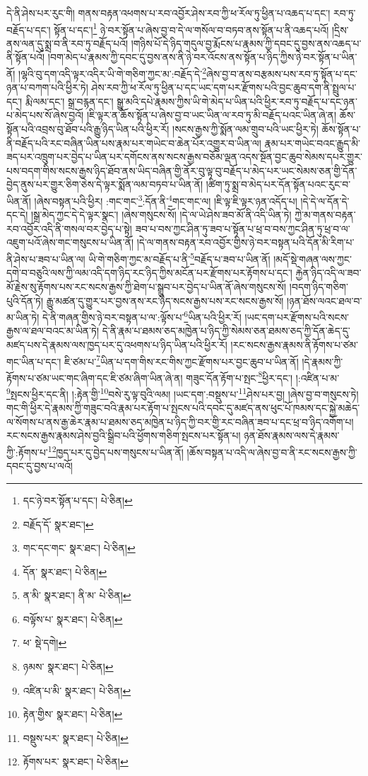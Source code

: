 དེ་ནི་ཤེས་པར་རུང་གི། གནས་བརྟན་འཕགས་པ་རབ་འབྱོར་ཤེས་རབ་ཀྱི་ཕ་རོལ་ཏུ་ཕྱིན་པ་འཆད་པ་དང་། རབ་ཏུ་བརྗོད་པ་དང་། སྟོན་པ་དང་།\footnote{དང་ཉེ་བར་སྟོན་པ་དང་།  པེ་ཅིན། } ཉེ་བར་སྟོན་པ་ཞེས་བྱ་བ་དེ་ལ་གསོལ་བ་བཏབ་ནས་སྟོན་པ་ནི་འཆད་པའོ། །དྲིས་ནས་ལན་དུ་སྨྲ་བ་ནི་རབ་ཏུ་བརྗོད་པའོ། །གཉིས་པོ་དེ་ཉིད་གདུལ་བྱ་རྨོངས་པ་རྣམས་ཀྱི་དབང་དུ་བྱས་ནས་འཆད་པ་ནི་སྟོན་པའོ། །བག་མེད་པ་རྣམས་ཀྱི་དབང་དུ་བྱས་ནས་ནི་ཉེ་བར་འོངས་ནས་སྟོན་པ་ཉིད་ཀྱིས་ཉེ་བར་སྟོན་པ་ཡིན་ནོ། །ལྷའི་བུ་དག་འདི་ལྟར་འདིར་ཡི་གེ་གཅིག་ཀྱང་མ་:བརྗོད་དེ་\footnote{བརྗོད་དོ་  སྣར་ཐང་། }ཞེས་བྱ་བ་ནས་བརྩམས་པས་རབ་ཏུ་སྟོན་པ་དང་ཉན་པ་བཀག་པའི་ཕྱིར་ཏེ། ཤེས་རབ་ཀྱི་ཕ་རོལ་ཏུ་ཕྱིན་པ་དང་ཡང་དག་པར་རྫོགས་པའི་བྱང་ཆུབ་དག་ནི་སྤྲུལ་པ་དང་། རྨི་ལམ་དང་། སྒྲ་བརྙན་དང་། སྒྱུ་མའི་དཔེ་རྣམས་ཀྱིས་ཡི་གེ་མེད་པ་ཡིན་པའི་ཕྱིར་རབ་ཏུ་བརྗོད་པ་དང་ཉན་པ་མེད་པས་སོ་ཞེས་བྱའོ། །ཇི་ལྟར་ན་ཆོས་སྟོན་པ་ཞེས་བྱ་བ་ཡང་ཡིན་ལ་རབ་ཏུ་མི་བརྗོད་པའང་ཡིན་ཞེ་ན། ཆོས་སྟོན་པའི་འབྲས་བུ་ཐོབ་པའི་རྒྱུ་ཉིད་ཡིན་པའི་ཕྱིར་རོ། །སངས་རྒྱས་ཀྱི་སྨོན་ལམ་གྲུབ་པའི་ཡང་ཕྱིར་ཏེ། ཆོས་སྟོན་པ་ནི་བརྗོད་པའི་རང་བཞིན་ཡིན་པས་རྣམ་པར་གཡེང་བ་ཆེན་པོར་འགྱུར་བ་ཡིན་ལ། རྣམ་པར་གཡེང་བའང་རྒྱུད་མི་ཟད་པར་འཁྲུག་པར་བྱེད་པ་ཡིན་པར་དགོངས་ནས་སངས་རྒྱས་བཅོམ་ལྡན་འདས་སྔོན་བྱང་ཆུབ་སེམས་དཔར་གྱུར་པས་བདག་གིས་སངས་རྒྱས་ཉིད་ཐོབ་ནས་ཡིད་བཞིན་གྱི་ནོར་བུ་ལྟ་བུ་བརྗོད་པ་མེད་པར་ཡང་སེམས་ཅན་གྱི་དོན་བྱེད་ནུས་པར་གྱུར་ཅིག་ཅེས་དེ་ལྟར་སྨོན་ལམ་བཏབ་པ་ཡིན་ནོ། །ཚིག་ཏུ་སྨྲ་བ་མེད་པར་དོན་སྟོན་པའང་རུང་བ་ཡིན་ནོ། །ཞེས་བསྟན་པའི་ཕྱིར། :གང་གང་\footnote{གང་དང་གང་  སྣར་ཐང་།  པེ་ཅིན། }:དོན་ནི་\footnote{དོན་  སྣར་ཐང་།  པེ་ཅིན། }གང་གང་ལ། །ཇི་ལྟ་ཇི་ལྟར་ཉན་འདོད་པ། །དེ་དེ་ལ་དོན་དེ་དང་དེ། །སྒྲ་མེད་ཀྱང་དེ་དེ་ལྟར་སྣང་། །ཞེས་གསུངས་སོ། །དེ་ལ་ཡེ་ཤེས་ཟབ་མོ་ནི་འདི་ཡིན་ཏེ། ཀྱེ་མ་གནས་བརྟན་རབ་འབྱོར་འདི་ནི་གསལ་བར་བྱེད་པ་སྟེ། ཟབ་པ་བས་ཀྱང་ཤིན་ཏུ་ཟབ་པ་སྟོན་པ་ཕྲ་བ་བས་ཀྱང་ཤིན་ཏུ་ཕྲ་བ་ལ་འཇུག་པའོ་ཞེས་གང་གསུངས་པ་ཡིན་ནོ། །དེ་ལ་གནས་བརྟན་རབ་འབྱོར་གྱིས་ཉེ་བར་བསྟན་པའི་དོན་མི་རིག་པ་ནི་ཤེས་པ་ཟབ་པ་ཡིན་ལ། ཡི་གེ་གཅིག་ཀྱང་མ་བརྗོད་པ་ནི་\footnote{ན་མི་  སྣར་ཐང་། ནི་མ་  པེ་ཅིན། }བརྗོད་པ་ཟབ་པ་ཡིན་ནོ། །མདོ་སྡེ་གཞན་ལས་ཀྱང་དགེ་བ་བཅུའི་ལས་ཀྱི་ལམ་འདི་དག་ཉིད་རང་ཉིད་ཀྱིས་མངོན་པར་རྫོགས་པར་རྟོགས་པ་དང་། རྐྱེན་ཉིད་འདི་ལ་ཟབ་མོ་རྗེས་སུ་རྟོགས་པས་རང་སངས་རྒྱས་ཀྱི་ཐེག་པ་སྒྲུབ་པར་བྱེད་པ་ཡིན་ནོ་ཞེས་གསུངས་སོ། །བདག་ཉིད་གཅིག་པུའི་དོན་ཏེ། རྒྱུ་མཚན་དུ་གྱུར་པར་བྱས་ནས་རང་ཉིད་སངས་རྒྱས་པས་རང་སངས་རྒྱས་སོ། །ཉན་ཐོས་ལའང་ཐལ་བ་མ་ཡིན་ཏེ། དེ་ནི་གཞན་གྱིས་ཉེ་བར་བསྟན་པ་ལ་:ལྟོས་པ་\footnote{བལྟོས་པ་  སྣར་ཐང་།  པེ་ཅིན། }ཡིན་པའི་ཕྱིར་རོ། །ཡང་དག་པར་རྫོགས་པའི་སངས་རྒྱས་ལ་ཐལ་བའང་མ་ཡིན་ཏེ། དེ་ནི་རྣམ་པ་ཐམས་ཅད་མཁྱེན་པ་ཉིད་ཀྱི་སེམས་ཅན་ཐམས་ཅད་ཀྱི་དོན་ཆེད་དུ་མཛད་པས་དེ་རྣམས་ལས་ཁྱད་པར་དུ་འཕགས་པ་ཉིད་ཡིན་པའི་ཕྱིར་རོ། །རང་སངས་རྒྱས་རྣམས་ནི་རྟོགས་པ་ཙམ་གང་ཡིན་པ་དང་། ཇི་ཙམ་པ་\footnote{ཕ་  སྡེ་དགེ། }ཡིན་པ་དག་གིས་རང་གིས་ཀྱང་རྫོགས་པར་བྱང་ཆུབ་པ་ཡིན་ནོ། །དེ་རྣམས་ཀྱི་རྟོགས་པ་ཙམ་ཡང་གང་ཞིག་དང་ཇི་ཙམ་ཞིག་ཡིན་ཞེ་ན། གཟུང་དོན་རྟོག་པ་སྤང་\footnote{ཉམས་  སྣར་ཐང་།  པེ་ཅིན། }ཕྱིར་དང་། །:འཛིན་པ་མ་\footnote{འཛིན་པ་མི་  སྣར་ཐང་།  པེ་ཅིན། }སྤངས་ཕྱིར་དང་ནི། །:རྟེན་གྱི་\footnote{རྟེན་གྱིས་  སྣར་ཐང་།  པེ་ཅིན། }བསེ་རུ་ལྟ་བུའི་ལམ། །ཡང་དག་:བསྡུས་པ་\footnote{བསྡུས་པར་  སྣར་ཐང་།  པེ་ཅིན། }ཤེས་པར་བྱ། །ཞེས་བྱ་བ་གསུངས་ཏེ། གང་གི་ཕྱིར་དེ་རྣམས་ཀྱི་གཟུང་བའི་རྣམ་པར་རྟོག་པ་སྤངས་པའི་དབང་དུ་མཛད་ནས་ཕུང་པོ་ཁམས་དང་སྐྱེ་མཆེད་ལ་སོགས་པ་ནས་རྒྱ་ཆེར་རྣམ་པ་ཐམས་ཅད་མཁྱེན་པ་ཉིད་ཀྱི་བར་གྱི་རང་བཞིན་ཟབ་པ་དང་ཕྲ་བ་ཉིད་འགོག་པ། རང་སངས་རྒྱས་རྣམས་ཤེས་བྱའི་སྒྲིབ་པའི་ཕྱོགས་གཅིག་སྤངས་པར་སྟོན་པ། ཉན་ཐོས་རྣམས་ལས་དེ་རྣམས་ཀྱི་:རྟོགས་པ་\footnote{རྟོགས་པར་  སྣར་ཐང་།  པེ་ཅིན། }ཁྱད་པར་དུ་བྱེད་པས་གསུངས་པ་ཡིན་ནོ། །ཆོས་བསྟན་པ་འདི་ལ་ཞེས་བྱ་བ་ནི་རང་སངས་རྒྱས་ཀྱི་དབང་དུ་བྱས་པ་ལའོ། 